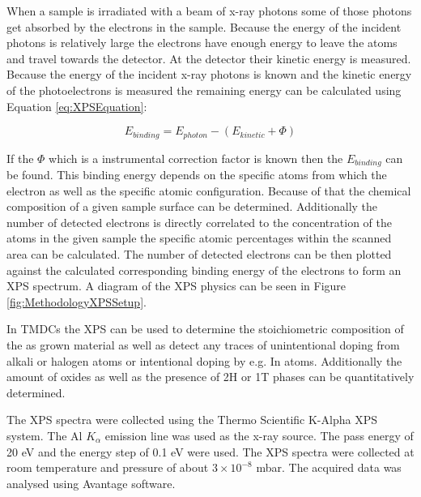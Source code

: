 When a sample is irradiated with a beam of x-ray photons some of those photons get absorbed by the electrons in the sample. Because the energy of the incident photons is relatively large the electrons have enough energy to leave the atoms and travel towards the detector. At the detector their kinetic energy is measured. Because the energy of the incident x-ray photons is known and the kinetic energy of the photoelectrons is measured the remaining energy can be calculated using Equation \ref{eq:XPSEquation}:

\begin{equation}
E_{binding}  = E_{photon} - (E_{kinetic} + \Phi)
\label{eq:XPSEquation}
\end{equation}

If the $\Phi$ which is a instrumental correction factor is known then the $E_{binding}$ can be found. This binding energy depends on the specific atoms from which the electron as well as the specific atomic configuration. Because of that the chemical composition of a given sample surface can be determined. Additionally the number of detected electrons is directly correlated to the concentration of the atoms in the given sample the specific atomic percentages within the scanned area can be calculated. The number of detected electrons can be then plotted against the calculated corresponding binding energy of the electrons to form an XPS spectrum. A diagram of the XPS physics can be seen in Figure \ref{fig:MethodologyXPSSetup}.

In TMDCs the XPS can be used to determine the stoichiometric composition of the as grown material as well as detect any traces of unintentional doping from alkali or halogen atoms or intentional doping by e.g. In atoms. Additionally the amount of oxides as well as the presence of 2H or 1T phases can be quantitatively determined. 

The XPS spectra were collected using the Thermo Scientific K-Alpha XPS system. The Al $K_{\alpha}$ emission line was used as the x-ray source. The pass energy of 20 eV and the energy step of 0.1 eV were used. The XPS spectra were collected at room temperature and pressure of about $3 \times 10^{-8}$ mbar. The acquired data was analysed using Avantage software.

